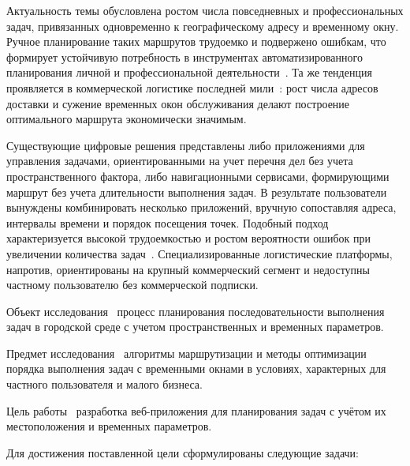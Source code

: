 \Introduction

Актуальность темы обусловлена ростом числа повседневных и профессиональных задач, привязанных одновременно к географическому адресу и временному окну. Ручное планирование таких маршрутов трудоемко и подвержено ошибкам, что формирует устойчивую потребность в инструментах автоматизированного планирования личной и профессиональной деятельности~\cite{bronnikova2010tm}. Та же тенденция проявляется в коммерческой логистике последней мили~\cite{shkodinskiy2025lastmile}: рост числа адресов доставки и сужение временных окон обслуживания делают построение оптимального маршрута экономически значимым.

Существующие цифровые решения представлены либо приложениями для управления задачами, ориентированными на учет перечня дел без учета пространственного фактора, либо навигационными сервисами, формирующими маршрут без учета длительности выполнения задач. В результате пользователи вынуждены комбинировать несколько приложений, вручную сопоставляя адреса, интервалы времени и порядок посещения точек. Подобный подход характеризуется высокой трудоемкостью и ростом вероятности ошибок при увеличении количества задач~\cite{reshenie_zadach_planirovaniya2020}. Специализированные логистические платформы, напротив, ориентированы на крупный коммерческий сегмент и недоступны частному пользователю без коммерческой подписки.

Объект исследования~\textendash{} процесс планирования последовательности выполнения задач в городской среде с учетом пространственных и временных параметров.

Предмет исследования~\textendash{} алгоритмы маршрутизации и методы оптимизации порядка выполнения задач с временными окнами в условиях, характерных для частного пользователя и малого бизнеса.

Цель работы~\textendash{} разработка веб-приложения для планирования задач с учётом их местоположения и временных параметров.

Для достижения поставленной цели сформулированы следующие задачи:


